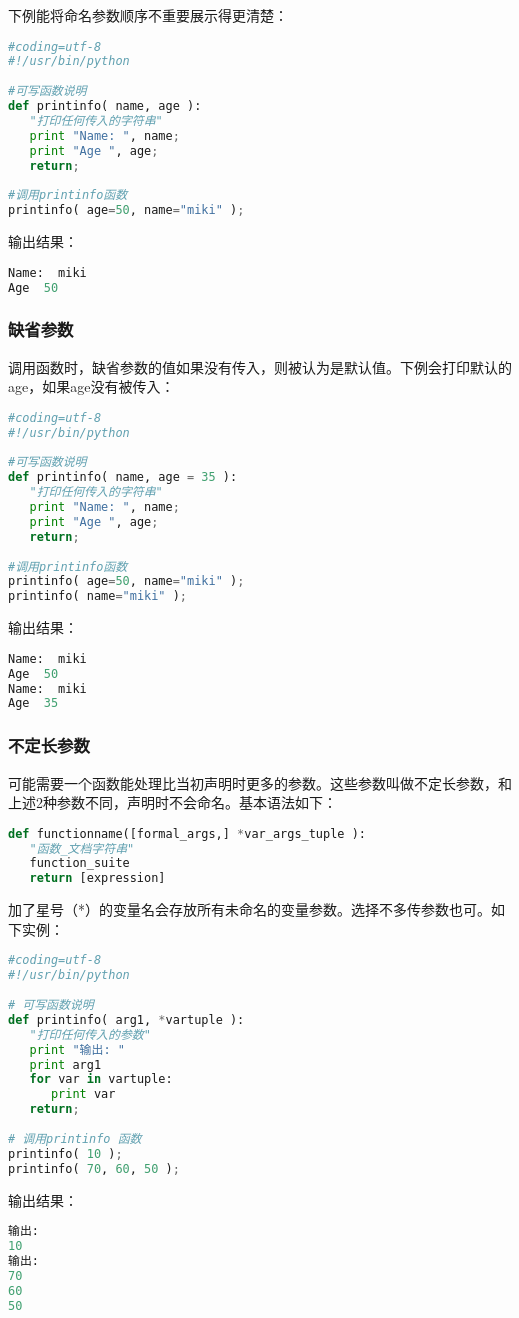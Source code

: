 下例能将命名参数顺序不重要展示得更清楚：
\begin{lstlisting}[language=Python]
#coding=utf-8
#!/usr/bin/python
 
#可写函数说明
def printinfo( name, age ):
   "打印任何传入的字符串"
   print "Name: ", name;
   print "Age ", age;
   return;
 
#调用printinfo函数
printinfo( age=50, name="miki" );
\end{lstlisting}
输出结果：
\begin{lstlisting}[language=Python]
Name:  miki
Age  50
\end{lstlisting}


\subsubsection{缺省参数}
调用函数时，缺省参数的值如果没有传入，则被认为是默认值。下例会打印默认的age，如果age没有被传入：
\begin{lstlisting}[language=Python]
#coding=utf-8
#!/usr/bin/python
 
#可写函数说明
def printinfo( name, age = 35 ):
   "打印任何传入的字符串"
   print "Name: ", name;
   print "Age ", age;
   return;
 
#调用printinfo函数
printinfo( age=50, name="miki" );
printinfo( name="miki" );
\end{lstlisting}
输出结果：
\begin{lstlisting}[language=Python]
Name:  miki
Age  50
Name:  miki
Age  35
\end{lstlisting}


\subsubsection{不定长参数}
可能需要一个函数能处理比当初声明时更多的参数。这些参数叫做不定长参数，和上述2种参数不同，声明时不会命名。基本语法如下：
\begin{lstlisting}[language=Python]
def functionname([formal_args,] *var_args_tuple ):
   "函数_文档字符串"
   function_suite
   return [expression]
\end{lstlisting}
加了星号（*）的变量名会存放所有未命名的变量参数。选择不多传参数也可。如下实例：
\begin{lstlisting}[language=Python]
#coding=utf-8
#!/usr/bin/python
 
# 可写函数说明
def printinfo( arg1, *vartuple ):
   "打印任何传入的参数"
   print "输出: "
   print arg1
   for var in vartuple:
      print var
   return;
 
# 调用printinfo 函数
printinfo( 10 );
printinfo( 70, 60, 50 );
\end{lstlisting}
输出结果：
\begin{lstlisting}[language=Python]
输出:
10
输出:
70
60
50
\end{lstlisting}


